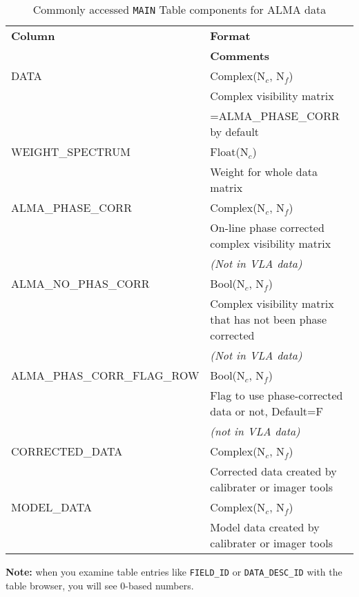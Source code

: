 \vspace{5mm}
\begin{table}[h!]
\caption[Commonly accessed {\tt MAIN} Table components for ALMA data]
        {\label{tabmain}Commonly accessed {\tt MAIN} Table components for ALMA data}
\begin{center}
\begin{tabular}{|ll|} \hline
  {\bf Column}      &  {\bf Format}        \\         
                    &  {\bf Comments}      \\        
  DATA              &  Complex(N$_c$, N$_f$)  \\       
                    &  Complex visibility matrix  \\
                    &  =ALMA\_PHASE\_CORR by default  \\
  WEIGHT\_SPECTRUM   &  Float(N$_c$)    \\            
                    &  Weight for whole data matrix \\     
  ALMA\_PHASE\_CORR   &  Complex(N$_c$, N$_f$) \\        
                    &  On-line phase corrected complex visibility matrix  \\
                    &  {\it (Not in VLA data)}  \\
  ALMA\_NO\_PHAS\_CORR  &  Bool(N$_c$, N$_f$)    \\     
                     & Complex visibility matrix that has not been phase corrected  \\
                     & {\it (Not in VLA data)}  \\
  ALMA\_PHAS\_CORR\_FLAG\_ROW  &  Bool(N$_c$, N$_f$)  \\
                           &  Flag to use phase-corrected data or not, Default=F  \\
                           &  {\it (not in VLA data)} \\    
  CORRECTED\_DATA   &  Complex(N$_c$, N$_f$)  \\     
                   &  Corrected data created by calibrater or imager tools \\ 
  MODEL\_DATA       &  Complex(N$_c$, N$_f$)      \\ 
                   &  Model data created by calibrater or imager tools  \\
\hline
\end{tabular}
\end{center}
\end{table}
{\bf Note:} when you examine table entries like {\tt FIELD\_ID} or 
{\tt DATA\_DESC\_ID} with the table browser, you will see 0-based numbers.

